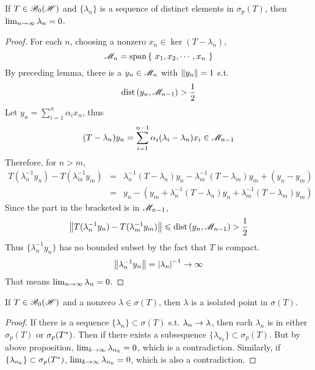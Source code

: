 \begin{prop}
	If $T \in \mathscr{B}_{0}\mathscr{(H)}$ and $\{\lambda_n\}$ is a sequence of distinct elements in $\sigma_p(T)$, then $\lim_{n \rightarrow \infty} \lambda_n = 0$.
\end{prop}
\begin{proof}
	For each $n$, choosing a nonzero $x_n \in \ker{(T-\lambda_n)}$,
	\begin{equation*}
		\mathscr{M}_n = \operatorname{span}{\{~x_1,x_2,\cdots,x_n~\}}
	\end{equation*}
	By preceding lemma, there is a $y_n \in \mathscr{M}_n$ with $\left\lVert y_n\right\lVert=1$ s.t.
	\begin{equation*}
		\operatorname{dist}{(y_n,\mathscr{M}_{n-1})} > \frac{1}{2}
	\end{equation*}
	Let $y_n = \sum_{i=1}^{n} \alpha_i x_n$, thus
	\begin{equation*}
		(T-\lambda_n)y_n = \sum_{i=1}^{n-1} \alpha_i (\lambda_i-\lambda_n)x_i \in \mathscr{M}_{n-1}
	\end{equation*}
	Therefore, for $n > m$,
	\begin{eqnarray*}
		T(\lambda_n^{-1}y_n)-T(\lambda_m^{-1}y_m) &=& \lambda_n^{-1}(T-\lambda_n)y_n - \lambda_m^{-1}(T-\lambda_m)y_m + (y_n - y_m) \\
		&=& y_n - (y_m + \lambda_n^{-1}(T-\lambda_n)y_n + \lambda_m^{-1}(T-\lambda_m)y_m)
	\end{eqnarray*}
	Since the part in the bracketed is in $\mathscr{M}_{n-1}$,
	\begin{equation*}
		\left\lVert T(\lambda_n^{-1}y_n)-T(\lambda_m^{-1}y_m)\right\lVert \leqslant \operatorname{dist}{(y_n,\mathscr{M}_{n-1})} > \frac{1}{2}
	\end{equation*}
	Thus $\{\lambda_n^{-1}y_n\}$ has no bounded subset by the fact that $T$ is compact.
	\begin{equation*}
		\left\lVert\lambda_n^{-1}y_n\right\lVert = \left\lvert\lambda_n\right\lvert^{-1} \rightarrow \infty
	\end{equation*}
	That means $\lim_{n \rightarrow \infty} \lambda_n = 0$.
\end{proof}

\begin{prop}
	If $T \in \mathscr{B}_{0}\mathscr{(H)}$ and a nonzero $\lambda \in \sigma(T)$, then $\lambda$ is a isolated point in $\sigma(T)$.
\end{prop}
\begin{proof}
	If there is a sequence $\{\lambda_n\} \subset \sigma(T)$ s.t. $\lambda_n \rightarrow \lambda$, then each $\lambda_n$ is in either $\sigma_p(T)$ or $\sigma_p(T^{*})$. Then if there exists a subsequence $\{\lambda_{n_k}\} \subset \sigma_p(T)$. But by above proposition, $\lim_{k \rightarrow \infty} \lambda_{n_k} =0$, which is a contradiction. Similarly, if $\{\lambda_{n_k}\} \subset \sigma_p(T^{*})$, $\lim_{k \rightarrow \infty} \lambda_{n_k} =0$, which is also a contradiction.
\end{proof}


